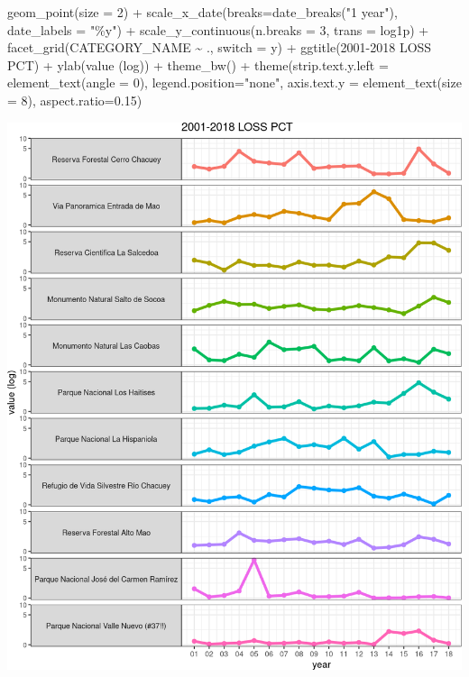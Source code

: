 \documentclass[10pt,landscape,a3paper]{article}
\newenvironment{Shaded}{\begin{snugshade}}{\end{snugshade}}
\newcommand{\AttributeTok}[1]{\textcolor[rgb]{0.77,0.63,0.00}{#1}}
\newcommand{\DecValTok}[1]{\textcolor[rgb]{0.00,0.00,0.81}{#1}}
\newcommand{\FloatTok}[1]{\textcolor[rgb]{0.00,0.00,0.81}{#1}}
\newcommand{\FunctionTok}[1]{\textcolor[rgb]{0.00,0.00,0.00}{#1}}
\newcommand{\NormalTok}[1]{#1}
\newcommand{\SpecialCharTok}[1]{\textcolor[rgb]{0.00,0.00,0.00}{#1}}
\newcommand{\StringTok}[1]{\textcolor[rgb]{0.31,0.60,0.02}{#1}}
\begin{document}
\begin{Shaded}
\begin{Highlighting}[]
  \FunctionTok{geom\_point}\NormalTok{(}\AttributeTok{size =} \DecValTok{2}\NormalTok{) }\SpecialCharTok{+} 
  \FunctionTok{scale\_x\_date}\NormalTok{(}\AttributeTok{breaks=}\FunctionTok{date\_breaks}\NormalTok{(}\StringTok{"1 year"}\NormalTok{), }\AttributeTok{date\_labels =} \StringTok{"\%y"}\NormalTok{) }\SpecialCharTok{+} 
  \FunctionTok{scale\_y\_continuous}\NormalTok{(}\AttributeTok{n.breaks =} \DecValTok{3}\NormalTok{, }\AttributeTok{trans =} \StringTok{\textquotesingle{}log1p\textquotesingle{}}\NormalTok{) }\SpecialCharTok{+}
  \FunctionTok{facet\_grid}\NormalTok{(CATEGORY\_NAME }\SpecialCharTok{\textasciitilde{}}\NormalTok{ ., }\AttributeTok{switch =} \StringTok{\textquotesingle{}y\textquotesingle{}}\NormalTok{) }\SpecialCharTok{+}
  \FunctionTok{ggtitle}\NormalTok{(}\StringTok{\textquotesingle{}2001{-}2018 LOSS PCT\textquotesingle{}}\NormalTok{) }\SpecialCharTok{+}
  \FunctionTok{ylab}\NormalTok{(}\StringTok{\textquotesingle{}value (log)\textquotesingle{}}\NormalTok{) }\SpecialCharTok{+}
  \FunctionTok{theme\_bw}\NormalTok{() }\SpecialCharTok{+}
  \FunctionTok{theme}\NormalTok{(}\AttributeTok{strip.text.y.left =} \FunctionTok{element\_text}\NormalTok{(}\AttributeTok{angle =} \DecValTok{0}\NormalTok{), }\AttributeTok{legend.position=}\StringTok{"none"}\NormalTok{,}
        \AttributeTok{axis.text.y =} \FunctionTok{element\_text}\NormalTok{(}\AttributeTok{size =} \DecValTok{8}\NormalTok{), }\AttributeTok{aspect.ratio=}\FloatTok{0.15}\NormalTok{)}
\end{Highlighting}
\end{Shaded}

\begin{center}\includegraphics{img/zonal-pa-3} \end{center}
\end{document}
